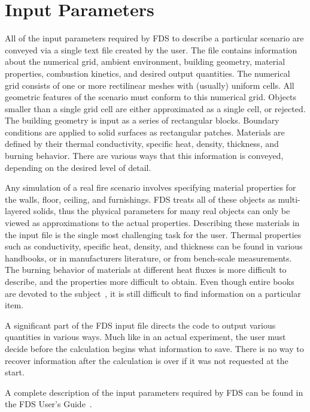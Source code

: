 \documentclass[11pt]{book}
\begin{document}
\section{Input Parameters}

All of the input parameters required by FDS to describe a particular scenario are conveyed via a single text file created by the user. The file
contains information about the numerical grid, ambient environment, building geometry, material properties, combustion kinetics, and desired output
quantities. The numerical grid consists of one or more rectilinear meshes with (usually) uniform cells. All geometric features of the scenario must
conform to this numerical grid. Objects smaller than a single grid cell are either approximated as a single cell, or rejected. The building geometry
is input as a series of rectangular blocks. Boundary conditions are applied to solid surfaces as rectangular patches. Materials are defined by their
thermal conductivity, specific heat, density, thickness, and burning behavior. There are various ways that this information is conveyed, depending on
the desired level of detail.

Any simulation of a real fire scenario involves specifying material properties for the walls, floor, ceiling, and furnishings. FDS treats all of
these objects as multi-layered solids, thus the physical parameters for many real objects can only be viewed as approximations to the actual
properties. Describing these materials in the input file is the single most challenging task for the user. Thermal properties such as conductivity,
specific heat, density, and thickness can be found in various handbooks, or in manufacturers literature, or from bench-scale measurements. The
burning behavior of materials at different heat fluxes is more difficult to describe, and the properties more difficult to obtain. Even though entire
books are devoted to the subject~\cite{Babrauskas:2}, it is still difficult to find information on a particular item.

A significant part of the FDS input file directs the code to output various quantities in various ways. Much like in an actual experiment, the user
must decide before the calculation begins what information to save. There is no way to recover information after the calculation is over if it was
not requested at the start.

A complete description of the input parameters required by FDS can be found in the FDS User's Guide~\cite{FDS_Users_Guide}.
\end{document}
